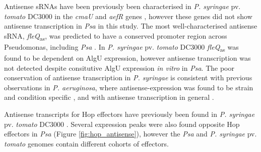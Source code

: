 Antisense sRNAs have been previously been characterised in \textit{P. syringae} pv. \textit{tomato} DC3000 in the \textit{cmaU} and \textit{aefR} genes \citep{Filiatrault_2010x}, however these genes did not show antisense transcription in \textit{Psa} in this study. The most well-characterised antisense sRNA, \textit{fleQ}\textsubscript{as}, was predicted to have a conserved promoter region across Pseudomonas, including \textit{Psa} \citep{Markel2018-yz}. In \textit{P. syringae} pv. \textit{tomato} DC3000 \textit{fleQ}\textsubscript{as} was found to be dependent on AlgU expression, however antisense transcription was not detected despite consitutive AlgU expression \textit{in vitro} in \textit{Psa}. 
The poor conservation of antisense transcription in \textit{P. syringae} is consistent with previous observations in \textit{P. aeruginosa}, where antisense-expression was found to be strain and condition specific \citep{Gomez-Lozano2014-sh}, and with antisense transcription in general \citep{Llorens-Rico2016-hvxx}. 

Antisense transcripts for Hop effectors have previously been found in \textit{P. syringae} pv. \textit{tomato} DC3000 \citep{Filiatrault_2010x}. Several expression peaks were also found opposite Hop effectors in \textit{Psa} (Figure \ref{fig:hop_antisense}), however the \textit{Psa} and \textit{P. syringae} pv. \textit{tomato} genomes contain different cohorts of effectors.%

